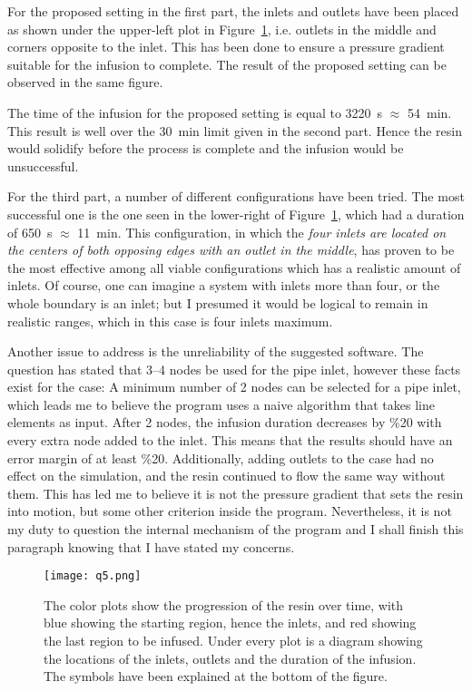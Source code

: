 \documentclass[a4paper,twosided,11pt,DIV14]{scrartcl}
\begin{document}
For the proposed setting in the first part, the inlets and outlets have been
placed as shown under the upper-left plot in Figure~\ref{fig:resin1}, i.e.
outlets in the middle and corners opposite to the inlet.
This has been done to ensure a pressure gradient suitable for the infusion to
complete. The result of the proposed setting can be observed in the same figure.

The time of the infusion for the
proposed setting is equal to \SI{3220}{s} $\approx$ \SI{54}{min}.
This result is well over the \SI{30}{min} limit given in the second part. Hence
the resin would solidify before the process is complete and the infusion would
be unsuccessful.

For the third part, a number of different configurations have been tried. The
most successful one is the one seen in the lower-right of
Figure~\ref{fig:resin1}, which had a duration of \SI{650}{s} $\approx$
\SI{11}{min}. This configuration, in which the \emph{four inlets are located on the centers
of both opposing edges with an outlet in the middle}, has proven to be the most
effective among all viable configurations which has a realistic amount of
inlets. Of course, one can imagine a system with inlets more than four, or the
whole boundary is an inlet; but I presumed it would be logical
to remain in realistic ranges, which in this case is four inlets maximum.

Another issue to address is the unreliability of the suggested software. The
question has stated that 3--4 nodes be used for the pipe inlet, however these
facts exist for the case: A minimum number of 2 nodes can be selected for a
pipe inlet, which leads me to believe the program uses a naive algorithm that
takes line elements as input. After 2 nodes, the infusion duration decreases by
\%20 with every extra node added to the inlet. This means that the results
should have an error margin of at least \%20. Additionally, adding outlets to
the case had no effect on the simulation, and the resin continued to flow the
same way without them. This has led me to believe it is not the pressure
gradient that sets the resin into motion, but some other criterion inside the
program.
Nevertheless, it is not my duty
to question the internal mechanism of the program and I shall finish this
paragraph knowing that I have stated my concerns.

\begin{figure}[H]
\begin{center}
  \texttt{[image: q5.png]}
\end{center}
\caption{The color plots show the progression of the resin over time, with blue
  showing the starting region, hence the inlets, and red showing the last region
  to be infused. Under every plot is a diagram showing the locations of the
  inlets, outlets and the duration of the infusion. The symbols have been
  explained at the bottom of the figure.}
\label{fig:resin1}
\end{figure}
\end{document}
